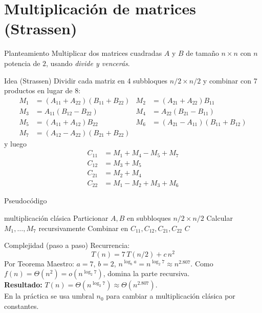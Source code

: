 \documentclass[aspectratio=169]{beamer}
\begin{document}
\section{Multiplicación de matrices (Strassen)}
\begin{frame}{Planteamiento}
Multiplicar dos matrices cuadradas $A$ y $B$ de tamaño $n{\times}n$ con $n$ potencia de $2$, usando \emph{divide y vencerás}.
\end{frame}

\begin{frame}{Idea (Strassen)}
Dividir cada matriz en 4 subbloques $n/2 \times n/2$ y combinar con 7 productos en lugar de 8:
\begin{align*}
M_1 &= (A_{11}\!+\!A_{22})(B_{11}\!+\!B_{22}) &
M_2 &= (A_{21}\!+\!A_{22})B_{11} \\
M_3 &= A_{11}(B_{12}\!-\!B_{22}) &
M_4 &= A_{22}(B_{21}\!-\!B_{11}) \\
M_5 &= (A_{11}\!+\!A_{12})B_{22} &
M_6 &= (A_{21}\!-\!A_{11})(B_{11}\!+\!B_{12}) \\
M_7 &= (A_{12}\!-\!A_{22})(B_{21}\!+\!B_{22})
\end{align*}
y luego
\begin{align*}
C_{11} &= M_1 + M_4 - M_5 + M_7\\
C_{12} &= M_3 + M_5\\
C_{21} &= M_2 + M_4\\
C_{22} &= M_1 - M_2 + M_3 + M_6
\end{align*}
\end{frame}

\begin{frame}{Pseudocódigo}
\begin{algorithm}[H]
\caption{Strassen($A,B$)}
\begin{algorithmic}[1]
 \State \Return multiplicación clásica
\EndIf
\State Particionar $A,B$ en subbloques $n/2\times n/2$
\State Calcular $M_1,\dots,M_7$ recursivamente
\State Combinar en $C_{11},C_{12},C_{21},C_{22}$
\State \Return $C$
\end{algorithmic}
\end{algorithm}
\end{frame}

\begin{frame}{Complejidad (paso a paso)}
Recurrencia:
\[ T(n) = 7\,T(n/2) + c\,n^2 \]
Por Teorema Maestro: $a{=}7$, $b{=}2$, $n^{\log_b a}=n^{\log_2 7}\approx n^{2.807}$. Como $f(n)=\Theta(n^2)=o(n^{\log_2 7})$, domina la parte recursiva.\\[1ex]
\textbf{Resultado: } $T(n)=\Theta(n^{\log_2 7})\approx \Theta(n^{2.807})$.\\[1ex]
En la práctica se usa umbral $n_0$ para cambiar a multiplicación clásica por constantes.
\end{frame}
\end{document}

